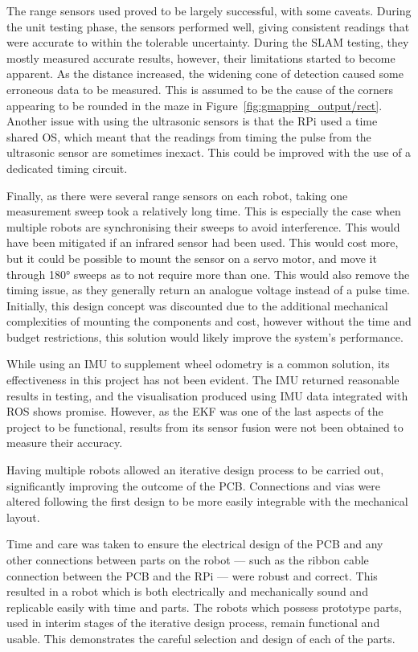The range sensors used proved to be largely successful, with some caveats.
During the unit testing phase, the sensors performed well, giving consistent
readings that were accurate to within the tolerable uncertainty. During the SLAM testing,
they mostly measured accurate results, however, their limitations started to
become apparent. As the distance increased, the widening cone of detection caused some
erroneous data to be measured. This is assumed to be the cause of the corners
appearing to be rounded in the maze in Figure~\ref{fig:gmapping_output/rect}. Another issue with using the ultrasonic sensors is that the RPi used a time
shared OS, which meant that the readings from timing the pulse from the
ultrasonic sensor are sometimes inexact. This could be improved with the use of
a dedicated timing circuit.

Finally, as there were several range sensors on each
robot, taking one measurement sweep took a relatively long time. This is
especially the case when multiple robots are synchronising their sweeps to avoid
interference. This would have been mitigated if an infrared sensor had been used.
This would cost more, but it could be possible to mount the sensor on a servo
motor, and move it through \ang{180} sweeps as to not require more than one.
This would also remove the timing issue, as they generally return an analogue
voltage instead of a pulse time. Initially, this design concept was discounted due to the additional mechanical complexities of mounting the components and
cost, however without the time and budget restrictions, this solution would
likely improve the system's performance.

While using an IMU to supplement wheel odometry is a common solution, its
effectiveness in this project has not been evident. The IMU
returned reasonable results in testing, and the visualisation produced using
IMU data integrated with ROS shows promise. However, as the EKF was one of the last aspects of the project to be functional, results from its sensor fusion were not been obtained to
measure their accuracy.

Having multiple robots allowed an
iterative design process to be carried out, significantly improving the outcome
of the PCB. Connections and vias were altered following the first design to be
more easily integrable with the mechanical layout.

Time and care was taken to ensure the electrical design of the PCB and any other
connections between parts on the robot --- such as the ribbon cable connection
between the PCB and the RPi --- were robust and correct. This resulted
in a robot which is both electrically and mechanically sound and replicable
easily with time and parts. The robots which possess prototype parts, used in
interim stages of the iterative design process, remain functional and usable.
This demonstrates the careful selection and design of each of the parts.

